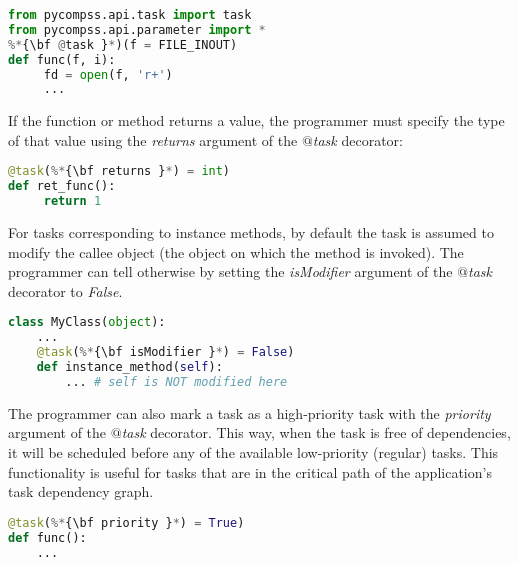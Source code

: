 \begin{lstlisting}[language=python]
from pycompss.api.task import task
from pycompss.api.parameter import *
%*{\bf @task }*)(f = FILE_INOUT)
def func(f, i):
     fd = open(f, 'r+')
     ...
\end{lstlisting}

If the function or method returns a value, the programmer must specify the type of that value using 
the {\it returns} argument of the {\it $@$task} decorator:

\begin{lstlisting}[language=python]
@task(%*{\bf returns }*) = int)
def ret_func():
     return 1
\end{lstlisting}

For tasks corresponding to instance methods, by default the task is assumed to modify the callee object 
(the object on which the method is invoked). The programmer can tell otherwise by setting the 
{\it isModifier} argument of the {\it $@$task} decorator to {\it False}.

\begin{lstlisting}[language=python]
class MyClass(object):
    ...
    @task(%*{\bf isModifier }*) = False)
    def instance_method(self):
        ... # self is NOT modified here
\end{lstlisting}

The programmer can also mark a task as a high-priority task with the {\it priority} argument of the 
{\it $@$task} decorator. This way, when the task is free of dependencies, it will be scheduled before 
any of the available low-priority (regular) tasks. This functionality is useful for tasks that are in 
the critical path of the application’s task dependency graph.

\begin{lstlisting}[language=python]
@task(%*{\bf priority }*) = True)
def func():
    ...
\end{lstlisting}

